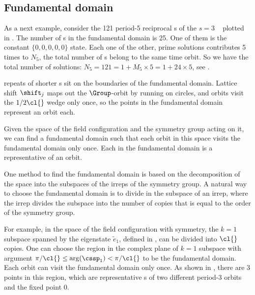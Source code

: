 \subsection{Fundamental domain} %

As a next example, consider the 121 period-5 reciprocal {\lattstate}s
of the $s=3$ \templatt\  plotted in .
The number of {\lattstate}s in the fundamental domain is 25. One of
them is the constant $\{0,0,0,0,0\}$ state. Each one of the other, prime
solutions contributes 5 times to $N_5$, the total number of {\lattstate}s
belong to the same time orbit. So we have the total number of solutions:
$N_5=121=1+M_5\times5 = 1+24\times5$, see  .


repeats of shorter {\lattstate}s sit on the boundaries of the fundamental domain.
Lattice shift $\shift_j$ maps out the $\Group$-orbit by running on
circles, and orbits visit the $1/2\cl{}$ wedge only once, so the points
in the fundamental domain represent an orbit each.


Given the space of the field configuration and the symmetry group acting on it,
we can find a fundamental domain such that each orbit in this space
visits the fundamental domain only once.
Each {\lattstate} in the fundamental domain is a representative {\lattstate} of an
orbit.

One method to find the fundamental domain is based on the decomposition
of the space into the subspaces of the irreps of the symmetry group.
A natural way to choose the fundamental domain is to divide in the
subspace of an irrep, where the irrep divides the subspace into the number
of copies that is equal to the order of the symmetry group.

For example, in the space of the field configuration with \Cn{\cl{}} symmetry, the $k=1$ subspace
spanned by the eigenstate $\tilde{e}_1$, defined in , can be divided
into $\cl{}$ copies. One can choose the region in the complex plane of $k=1$ subspace
with argument $\pi/\cl{}\leq\arg(\cssp_{1})<\pi/\cl{}$ to be the fundamental domain.
Each orbit can visit the fundamental domain only once. As shown in ,
there are 3 points in this region, which are representative {\lattstate}s of two different
period-3 orbits and the fixed point $0$.
